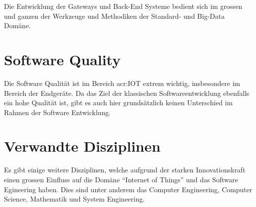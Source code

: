 Die Entwicklung der Gateways und Back-End Systeme bedient sich im grossen und ganzen der Werkzeuge und Methodiken der Standard- und Big-Data Domäne. 


\section{Software Quality}
Die Software Qualität ist im Bereich \gls{acr:IOT} extrem wichtig, insbesondere im Bereich der Endgeräte. Da das Ziel der klassischen Softwareentwicklung ebenfalls ein hohe Qualität ist, gibt es auch hier grundsätzlich keinen Unterschied im Rahmen der Software Entwicklung.


\section{Verwandte Disziplinen}
Es gibt einige weitere Disziplinen, welche aufgrund der starken Innovationskraft einen grossen Einfluss auf die Domäne "`Internet of Things"' und das Software Egineering haben. Dies sind unter anderem das Computer Engineering, Computer Science, Mathematik und System Engineering.
